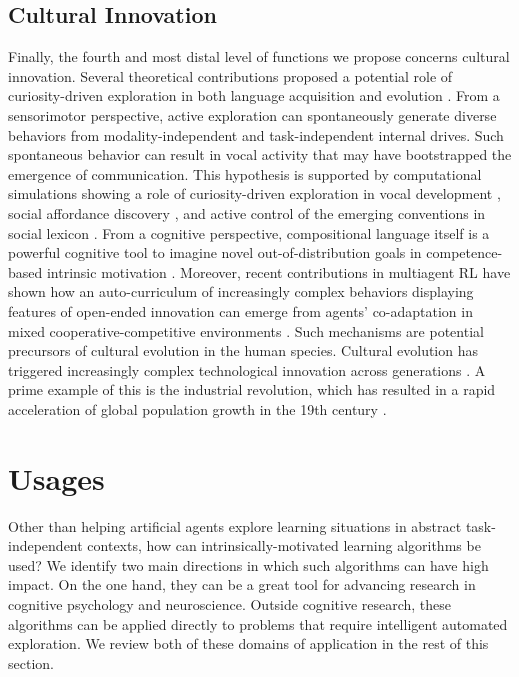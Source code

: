 \subsection{Cultural Innovation}\label{CH3_SS_cultural_innovation}
Finally, the fourth and most distal level of functions we propose concerns cultural innovation. Several theoretical contributions proposed a potential role of curiosity-driven exploration in both language acquisition \parencite{oller_emergence_2000} and evolution \parencite{oudeyer_how_2016}. From a sensorimotor perspective, active exploration can spontaneously generate diverse behaviors from modality-independent and task-independent internal drives. Such spontaneous behavior can result in vocal activity that may have bootstrapped the emergence of communication. This hypothesis is supported by computational simulations showing a role of curiosity-driven exploration in vocal development \parencite{moulin-frier_self-organization_2014}, social affordance discovery \parencite{oudeyer_discovering_2006}, and active control of the emerging conventions in social lexicon \parencite{schueller2018complexity}. From a cognitive perspective, compositional language itself is a powerful cognitive tool to imagine novel out-of-distribution goals in competence-based intrinsic motivation \parencite{colas_language_2020}. Moreover, recent contributions in multiagent RL have shown how an auto-curriculum of increasingly complex behaviors displaying features of open-ended innovation can emerge from agents’ co-adaptation in mixed cooperative-competitive environments \parencite{baker_emergent_2020}. Such mechanisms are potential precursors of cultural evolution in the human species. Cultural evolution has triggered increasingly complex technological innovation across generations \parencite{fogarty_niche_2017}. A prime example of this is the industrial revolution, which has resulted in a rapid acceleration of global population growth in the 19th century \parencite{lucas_industrial_2004}.

\section{Usages}\label{CH3_S_usages}
Other than helping artificial agents explore learning situations in abstract task-independent contexts, how can intrinsically-motivated learning algorithms be used? We identify two main directions in which such algorithms can have high impact. On the one hand, they can be a great tool for advancing research in cognitive psychology and neuroscience. Outside cognitive research, these algorithms can be applied directly to problems that require intelligent automated exploration. We review both of these domains of application in the rest of this section.

